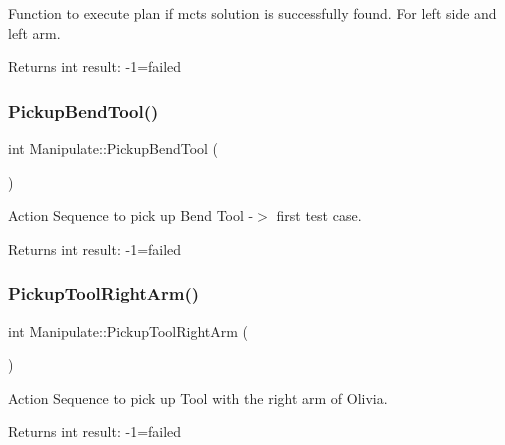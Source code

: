 Function to execute plan if mcts solution is successfully found. For left side and left arm. 

\begin{DoxyReturn}{Returns}
int result\+: -\/1=failed 
\end{DoxyReturn}
\mbox{\label{structManipulate_aba8393a0211102ece9e667969dc20102}} 
\subsubsection{\texorpdfstring{Pickup\+Bend\+Tool()}{PickupBendTool()}}
{\footnotesize\ttfamily int Manipulate\+::\+Pickup\+Bend\+Tool (\begin{DoxyParamCaption}{ }\end{DoxyParamCaption})\hspace{0.3cm}{\ttfamily [private]}}



Action Sequence to pick up Bend Tool -\/$>$ first test case. 

\begin{DoxyReturn}{Returns}
int result\+: -\/1=failed 
\end{DoxyReturn}
\mbox{\label{structManipulate_a21c87a257e786f4ab336d26074770283}} 
\subsubsection{\texorpdfstring{Pickup\+Tool\+Right\+Arm()}{PickupToolRightArm()}}
{\footnotesize\ttfamily int Manipulate\+::\+Pickup\+Tool\+Right\+Arm (\begin{DoxyParamCaption}{ }\end{DoxyParamCaption})\hspace{0.3cm}{\ttfamily [private]}}



Action Sequence to pick up Tool with the right arm of Olivia. 

\begin{DoxyReturn}{Returns}
int result\+: -\/1=failed 
\end{DoxyReturn}
\mbox{\label{structManipulate_a74fb07d3b191e25ca23c36b1cc7ed6a9}} 
